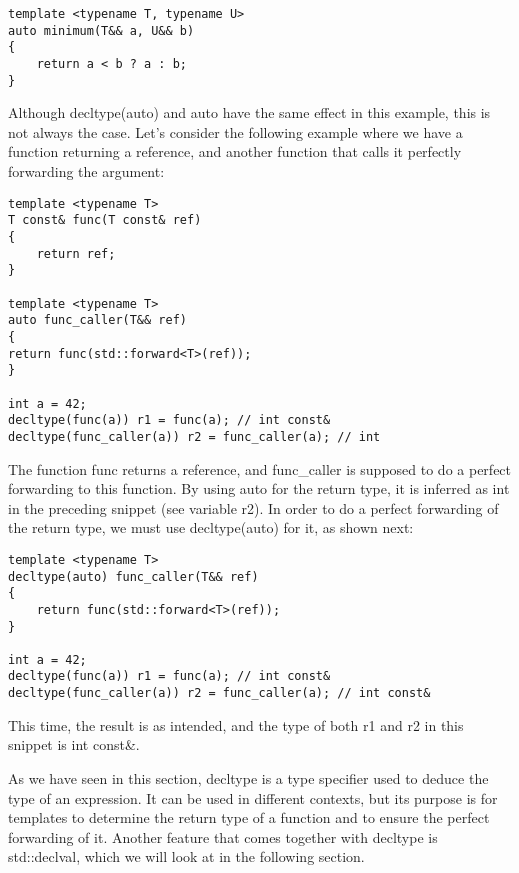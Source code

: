 \begin{lstlisting}[style=styleCXX]
template <typename T, typename U>
auto minimum(T&& a, U&& b)
{
	return a < b ? a : b;
}
\end{lstlisting}

Although decltype(auto) and auto have the same effect in this example, this is not always the case. Let’s consider the following example where we have a function returning a reference, and another function that calls it perfectly forwarding the argument:

\begin{lstlisting}[style=styleCXX]
template <typename T>
T const& func(T const& ref)
{
	return ref;
}

template <typename T>
auto func_caller(T&& ref)
{
return func(std::forward<T>(ref));
}

int a = 42;
decltype(func(a)) r1 = func(a); // int const&
decltype(func_caller(a)) r2 = func_caller(a); // int
\end{lstlisting}

The function func returns a reference, and func\_caller is supposed to do a perfect forwarding to this function. By using auto for the return type, it is inferred as int in the preceding snippet (see variable r2). In order to do a perfect forwarding of the return type, we must use decltype(auto) for it, as shown next:

\begin{lstlisting}[style=styleCXX]
template <typename T>
decltype(auto) func_caller(T&& ref)
{
	return func(std::forward<T>(ref));
}

int a = 42;
decltype(func(a)) r1 = func(a); // int const&
decltype(func_caller(a)) r2 = func_caller(a); // int const&
\end{lstlisting}

This time, the result is as intended, and the type of both r1 and r2 in this snippet is int const\&.

As we have seen in this section, decltype is a type specifier used to deduce the type of an expression. It can be used in different contexts, but its purpose is for templates to determine the return type of a function and to ensure the perfect forwarding of it. Another feature that comes together with decltype is std::declval, which we will look at in the following section.









